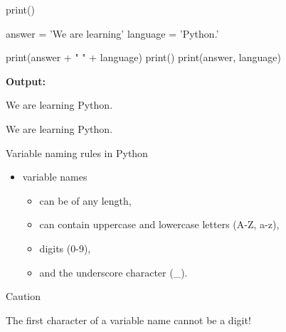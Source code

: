 \documentclass[
  american,
  ignorenonframetext,
]{beamer}
\providecommand{\tightlist}{%
  \setlength{\itemsep}{0pt}\setlength{\parskip}{0pt}}
\newenvironment{pyexec}[1]{\noindent \textbf{Output: }  #1}{}
\begin{document}
\begin{frame}{print()}
\protect\hypertarget{print}{}

\begin{pythoncode}

answer = 'We are learning'
language = 'Python.'

print(answer + " " + language)
print()
print(answer, language)

\end{pythoncode}

\begin{pyexec}

\begin{outputcode}

We are learning Python.

We are learning Python.

\end{outputcode}

\end{pyexec}


\end{frame}

\begin{frame}{Variable naming rules in Python}
\protect\hypertarget{variable-naming-rules-in-python}{}

\begin{itemize}
\tightlist
\item
  variable names

  \begin{itemize}
  \tightlist
  \item
    can be of any length,
  \item
    can contain uppercase and lowercase letters (A-Z, a-z),
  \item
    digits (0-9),
  \item
    and the underscore character (\_). \vspace{2em}
  \end{itemize}
\end{itemize}

\begin{block}{Caution}

The first character of a variable name cannot be a digit!

\end{block}

\end{frame}
\end{document}
